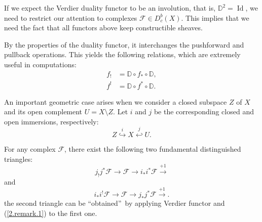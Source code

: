 \begin{remark}
If we expect the Verdier duality functor to be an involution, that is, $\mathbb{D}^2 = \operatorname{Id}$, 
we need to restrict our attention to complexes $\mathcal{F} \in D^b_c(X)$. 
This implies that we need the fact that all functors above keep constructible sheaves.

By the properties of the duality functor, it interchanges the pushforward and pullback operations. This yields the following relations, which are extremely useful in computations:
\begin{align}\label{2.remark.1}
    f_! &= \mathbb{D} \circ f_* \circ \mathbb{D}, \\
    f^! &= \mathbb{D} \circ f^* \circ \mathbb{D}.
\end{align}
\end{remark}

An important geometric case arises when we consider a closed subspace $Z$ of $X$ and its open complement $U = X \setminus Z$. Let $i$ and $j$ be the corresponding closed and open immersions, respectively:
\begin{equation*}
    Z \overset{i}{\hookrightarrow} X \overset{j}{\hookleftarrow} U.
\end{equation*}

For any complex $\mathcal{F}$, there exist the following two fundamental distinguished triangles:
\begin{equation*}
    j_! j^* \mathcal{F} \longrightarrow \mathcal{F} \longrightarrow i_* i^* \mathcal{F} \xrightarrow{+1}
\end{equation*}
and
\begin{equation*}
    i_* i^! \mathcal{F} \longrightarrow \mathcal{F} \longrightarrow j_* j^* \mathcal{F} \xrightarrow{+1}.
\end{equation*}
the second triangle can be “obtained”\ by applying Verdier functor and (\ref{2.remark.1}) to the first one.